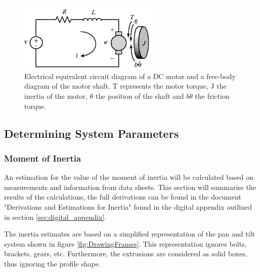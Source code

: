 \documentclass[../../main.tex]{subfiles}
\begin{document}
\begin{figure}[H]
    \centering
    \includegraphics[width=0.6\textwidth]{Sections/System_Modelling/Images/Armature_Layout.PNG}
    \caption{Electrical equivalent circuit diagram of a DC motor and a free-body diagram of the motor shaft. T represents the motor torque, J the inertia of the motor, $\theta$ the position of the shaft and $b\dot{\theta}$ the friction torque. \cite{universityofmichigan2019}}
    \label{fig:Armature_Circuit}
\end{figure}




\subsection{Determining System Parameters}\label{subsec:motorParameters}
\subsubsection*{Moment of Inertia}
An estimation for the value of the moment of inertia will be calculated based on measurements and information from data sheets. This section will summarise the results of the calculations, the full derivations can be found in the document "Derivations and Estimations for Inertia" found in the digital appendix outlined in section \ref{sec:digital_appendix}.



The inertia estimates are based on a simplified representation of the pan and tilt system shown in figure \ref{fig:DrawingFrames}. This representation ignores bolts, brackets, gears, etc. Furthermore, the extrusions are considered as solid boxes, thus ignoring the profile shape.
\end{document}
